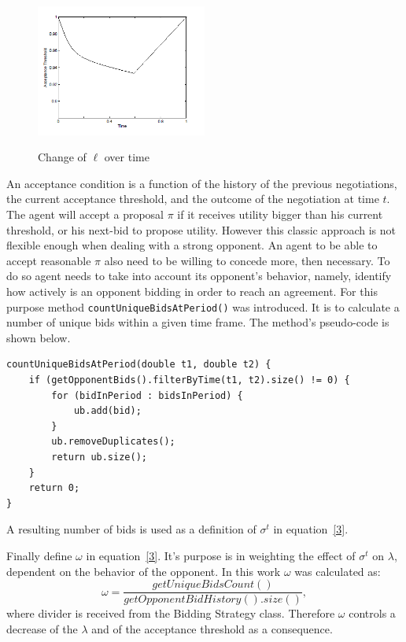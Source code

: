 \documentclass[html]{report}    %
\begin{document}
\begin{figure}[htbp]
	\caption{Change of $\ell$ over time}
	\centering
	\includegraphics[width=0.5\textwidth]{ell}
	\label{2}
\end{figure}

An acceptance condition is a function of the history of the previous negotiations, the current acceptance threshold, and the outcome of the negotiation at time $t$. The agent will accept a proposal $\pi$ if it receives utility bigger than his current threshold, or his next-bid to propose utility. However this classic approach is not flexible enough when dealing with a strong opponent. An agent to be able to accept reasonable $\pi$ also need to be willing to concede more, then necessary. To do so agent needs to take into account its opponent's behavior, namely, identify how actively is an opponent bidding in order to reach an agreement. For this purpose method \texttt{countUniqueBidsAtPeriod()} was introduced. It is to calculate a number of unique bids within a given time frame. The method's pseudo-code is shown below.
\begin{verbatim}
countUniqueBidsAtPeriod(double t1, double t2) {
    if (getOpponentBids().filterByTime(t1, t2).size() != 0) {
        for (bidInPeriod : bidsInPeriod) {
            ub.add(bid);
        }
        ub.removeDuplicates();
        return ub.size();
    }
    return 0;
}
\end{verbatim}
A resulting number of bids is used as a definition of $\sigma^t$ in equation~\ref{3}.

Finally define $\omega$ in equation~\ref{3}. It's purpose is in weighting the effect of $\sigma^t$ on $\lambda$, dependent on the behavior of the opponent. In this work $\omega$ was calculated as:
\begin{dmath} \label{6}	
	\omega = \frac{getUniqueBidsCount()}{getOpponentBidHistory().size()},
\end{dmath}
where divider is received from the Bidding Strategy class. Therefore $\omega$ controls a decrease of the $\lambda$ and of the acceptance threshold as a consequence.
\end{document}
